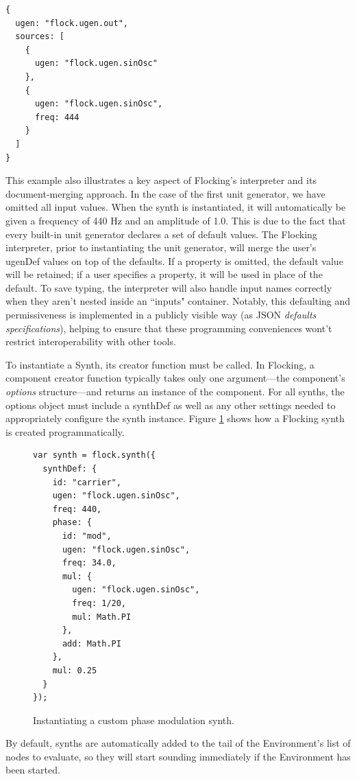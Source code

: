 \documentclass{article}
\begin{document}
\begin{verbatim}
{
  ugen: "flock.ugen.out",
  sources: [
    {
      ugen: "flock.ugen.sinOsc"
    },
    {
      ugen: "flock.ugen.sinOsc",
      freq: 444
    }
  ]
}
\end{verbatim}

This example also illustrates a key aspect of Flocking's interpreter and its document-merging approach. In the case of the first unit generator, we have omitted all input values. When the synth is instantiated, it will automatically be given a frequency of 440 Hz and an amplitude of 1.0. This is due to the fact that every built-in unit generator declares a set of default values. The Flocking interpreter, prior to instantiating the unit generator, will merge the user's ugenDef values on top of the defaults. If a property is omitted, the default value will be retained; if a user specifies a property, it will be used in place of the default. To save typing, the interpreter will also handle input names correctly when they aren't nested inside an ``inputs" container. Notably, this defaulting and permissiveness is implemented in a publicly visible way (as JSON {\it defaults specifications}), helping to ensure that these programming conveniences wont't restrict interoperability with other tools.

To instantiate a Synth, its creator function must be called. In Flocking, a component creator function typically takes only one argument---the component's {\it options} structure---and returns an instance of the component. For all synths, the options object must include a synthDef as well as any other settings needed to appropriately configure the synth instance. Figure \ref{fig:pmSynth} shows how a Flocking synth is created programmatically.

\begin{figure}[h!]
    \begin{verbatim}
var synth = flock.synth({
  synthDef: {
    id: "carrier",
    ugen: "flock.ugen.sinOsc",
    freq: 440,
    phase: {
      id: "mod",
      ugen: "flock.ugen.sinOsc",
      freq: 34.0,
      mul: {
        ugen: "flock.ugen.sinOsc",
        freq: 1/20,
        mul: Math.PI
      },
      add: Math.PI
    },
    mul: 0.25
  }
});
    \end{verbatim}
    \caption{Instantiating a custom phase modulation synth.\label{fig:pmSynth}}
\end{figure}

By default, synths are automatically added to the tail of the Environment's list of nodes to evaluate, so they will start sounding immediately if the Environment has been started.
\end{document}
